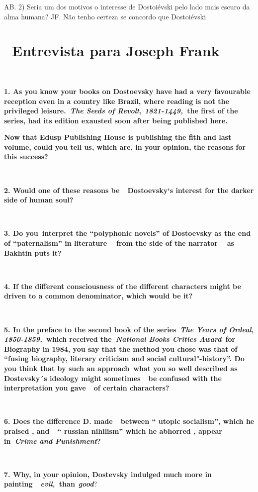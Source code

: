 AB. 2) Seria um dos motivos o interesse de Dostoiévski pelo lado mais
escuro da alma humana? JF. Não tenho certeza se concordo que Dostoiévski

\section{~Entrevista para Joseph Frank~}

\textbf{~}

\textbf{1. As you know your books on Dostoevsky have had a very
favourable reception even in a country like Brazil, where reading is not
the privileged leisure.~\emph{The Seeds of Revolt, 1821-1449,~}the first
of the series, had its edition exausted soon after being published
here.}

\textbf{Now that Edusp Publishing House is publishing the fith and last
volume, could you tell us, which are, in your opinion, the reasons for
this success?}

\textbf{~}

\textbf{2. Would one of these reasons be~~Dostoevsky`s interest for the
darker side of human soul?}

\textbf{~}

\textbf{3. Do you~interpret the ``polyphonic novels'' of Dostoevsky as
the end of ``paternalism'' in literature -- from the side of the
narrator -- as Bakhtin puts it?}

\textbf{~}

\textbf{4. If the different consciousness of the different characters
might be driven to a common denominator, which would be it?}

\textbf{~}

\textbf{5. In the preface to the second book of the series~\emph{The
Years of Ordeal, 1850-1859,~}which received the~\emph{National Books
Critics Award}~for Biography in 1984, you say that the method you chose
was that of ``fusing biography, literary criticism and social
cultural"-history''. Do you think that by such an approach~what you so
well described as Dostevsky´s ideology might sometimes~~be confused with
the interpretation you gave~~of certain characters?}

\textbf{~}

\textbf{6. Does the difference D. made~~between `` utopic socialism'',
which he praised , and~~`` russian nihilism'' which he abhorred , appear
in~\emph{Crime and Punishment}?}

\textbf{~}

\textbf{7. Why, in your opinion, Dostevsky indulged much more in
painting~~\emph{evil,~}than}~\emph{\textbf{good}}?

